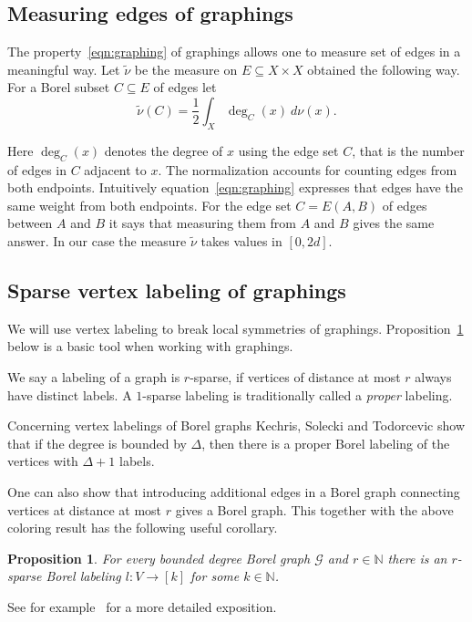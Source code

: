 \documentclass[11pt]{article}
\newtheorem{prop}[theo]{Proposition}
\theoremstyle{definition}
\numberwithin{equation}{section}
\numberwithin{figure}{section}
\numberwithin{table}{section}
\newcommand{\N}{\mathbb{N}}
\newcommand{\G}{\mathcal{G}}
\begin{document}
\subsection{Measuring edges of graphings}

The property~\eqref{eqn:graphing} of graphings allows one to measure set of edges in a meaningful way. Let $\widetilde{\nu}$ be the measure on $E \subseteq X \times X$ obtained the following way. For a Borel subset $C \subseteq E$ of edges let
\[
\widetilde{\nu} (C) = \frac{1}{2} \int_{X} \deg_{C}(x) \ d \nu(x).
\]

Here $\deg_{C}(x)$ denotes the degree of $x$ using the edge set $C$, that is the number of edges in $C$ adjacent to $x$. The normalization accounts for counting edges from both endpoints. Intuitively equation~\eqref{eqn:graphing} expresses that edges have the same weight from both endpoints. For the edge set $C=E(A,B)$ of edges between $A$ and $B$ it says that measuring them from $A$ and $B$ gives the same answer. In our case the measure $\widetilde{\nu}$ takes values in $[0,2d]$.

\subsection{Sparse vertex labeling of graphings}

We will use vertex labeling to break local symmetries of graphings. Proposition~\ref{corollary:sparse_labeling} below is a basic tool when working with graphings.

We say a labeling of a graph is $r$-sparse, if vertices of distance at most $r$ always have distinct labels. A $1$-sparse labeling is traditionally called a \emph{proper} labeling.

Concerning vertex labelings of Borel graphs Kechris, Solecki and Todorcevic \cite[Theorem~4.6]{kechris1999borel} show that if the degree is bounded by $\Delta$, then there is a proper Borel labeling of the vertices with $\Delta+1$ labels.

One can also show that introducing additional edges in a Borel graph connecting vertices at distance at most $r$ gives a Borel graph. This together with the above coloring result has the following useful corollary.

\begin{prop}\label{corollary:sparse_labeling}
For every bounded degree Borel graph $\G$ and $r \in \N$ there is an $r$-sparse Borel labeling $l : V \to [k]$ for some $k \in \N$.
\end{prop}
See for example~\cite[Corollary~3.1]{csoka2016kHonig} for a more detailed exposition.
\end{document}

